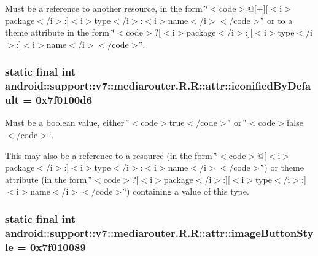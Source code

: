 Must be a reference to another resource, in the form \char`\"{}$<$code$>$@\mbox{[}+\mbox{]}\mbox{[}$<$i$>$package$<$/i$>$:\mbox{]}$<$i$>$type$<$/i$>$:$<$i$>$name$<$/i$>$$<$/code$>$\char`\"{} or to a theme attribute in the form \char`\"{}$<$code$>$?\mbox{[}$<$i$>$package$<$/i$>$:\mbox{]}\mbox{[}$<$i$>$type$<$/i$>$:\mbox{]}$<$i$>$name$<$/i$>$$<$/code$>$\char`\"{}. \hypertarget{classandroid_1_1support_1_1v7_1_1mediarouter_1_1_r_1_1attr_29a263259ba43067ae2f37d484e0be19}{
\subsubsection[{iconifiedByDefault}]{\setlength{\rightskip}{0pt plus 5cm}static final int android::support::v7::mediarouter.R.R::attr::iconifiedByDefault = 0x7f0100d6}}
\label{classandroid_1_1support_1_1v7_1_1mediarouter_1_1_r_1_1attr_29a263259ba43067ae2f37d484e0be19}


Must be a boolean value, either \char`\"{}$<$code$>$true$<$/code$>$\char`\"{} or \char`\"{}$<$code$>$false$<$/code$>$\char`\"{}. 

This may also be a reference to a resource (in the form \char`\"{}$<$code$>$@\mbox{[}$<$i$>$package$<$/i$>$:\mbox{]}$<$i$>$type$<$/i$>$:$<$i$>$name$<$/i$>$$<$/code$>$\char`\"{}) or theme attribute (in the form \char`\"{}$<$code$>$?\mbox{[}$<$i$>$package$<$/i$>$:\mbox{]}\mbox{[}$<$i$>$type$<$/i$>$:\mbox{]}$<$i$>$name$<$/i$>$$<$/code$>$\char`\"{}) containing a value of this type. \hypertarget{classandroid_1_1support_1_1v7_1_1mediarouter_1_1_r_1_1attr_5013c0057853f7a74d93d211d891601e}{
\subsubsection[{imageButtonStyle}]{\setlength{\rightskip}{0pt plus 5cm}static final int android::support::v7::mediarouter.R.R::attr::imageButtonStyle = 0x7f010089}}
\label{classandroid_1_1support_1_1v7_1_1mediarouter_1_1_r_1_1attr_5013c0057853f7a74d93d211d891601e}


